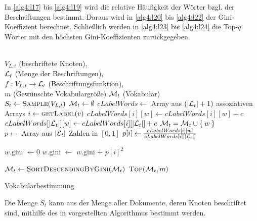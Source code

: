 In \cref{alg4:l17} bis \ref{alg4:l19} wird die relative Häufigkeit der Wörter
bzgl. der Beschriftungen bestimmt. Daraus wird in \cref{alg4:l20} bis
\ref{alg4:l22} der Gini-Koeffizient berechnet. Schließlich werden in
\cref{alg4:l23} bis \ref{alg4:l24} die Top-$q$ Wörter mit den
höchsten Gini-Koeffizienten zurückgegeben.

\begin{algorithm}[ht]
    \begin{algorithmic}[1]
        \Require \\
                 $V_{L,t}$ (beschriftete Knoten),\\
                 $\mathcal{L}_t$ (Menge der Beschriftungen),\\
                 $f:V_{L,t} \rightarrow \mathcal{L}_t$ (Beschriftungsfunktion),\\
                 $m$ (Gewünschte Vokabulargröße)
        \Ensure  $\mathcal{M}_t$ (Vokabular)\\
        \State $S_t \gets \Call{Sample}{V_{L,t}}$\label{alg4:l6} 
        \State $\mathcal{M}_t \gets \emptyset$ 
        \State $cLabelWords \gets$ Array aus $(|\mathcal{L}_t|+1)$ assoziativen Arrays\label{alg4:l8}
         \label{alg4:l10}
            \State $i \gets \Call{getLabel}{v}$
            \State {}
                \State $cLabelWords[i][w] \gets cLabelWords[i][w] + c$
                \State $cLabelWords[|\mathcal{L}_t|][w] \gets cLabelWords[i][|\mathcal{L}_t|] + c$
                \State $\mathcal{M}_t = \mathcal{M}_t \cup \Set{w}$
            \EndFor
        \EndFor\label{alg4:l12}
		\\
            \State $p \gets $ Array aus $|\mathcal{L}_t|$ Zahlen in $[0, 1]$\label{alg4:l17}
                \State $p[i] \gets \frac{cLabelWords[i][w]}{cLabelWords[i][|\mathcal{L}_t|]}$
            \EndFor\label{alg4:l19}

            \State $w$.gini $\gets 0$ \label{alg4:l20}
                \State $w$.gini $\gets$ $w$.gini + $p[i]^2$
            \EndFor\label{alg4:l22}
        \EndFor

        \State $\M_t \gets \Call{SortDescendingByGini}{\M_t}$\label{alg4:l23}
        \State \Return $\Call{Top}{\M_t, m}$\label{alg4:l24}
    \end{algorithmic}
\caption{Vokabularbestimmung}
\label{alg:vokabularbestimmung}
\end{algorithm}

Die Menge $S_t$ kann aus der Menge aller Dokumente, deren Knoten beschriftet
sind, mithilfe des in \cite{Vitter} vorgestellten Algorithmus bestimmt werden.
